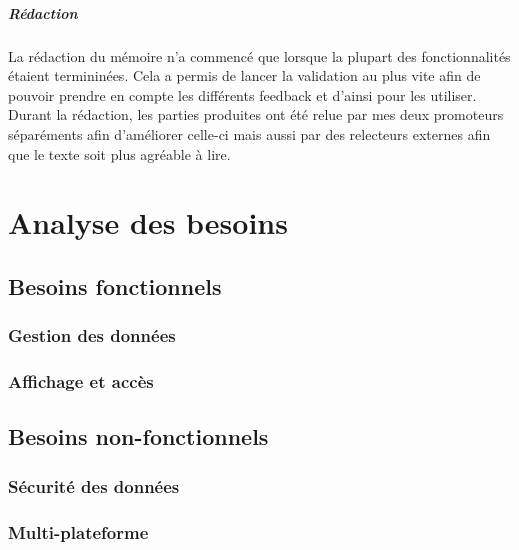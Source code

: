 \documentclass{EPL-master-thesis-covers-FR}
\begin{document}
			
			\paragraph*{Rédaction}
			La rédaction du mémoire n'a commencé que lorsque la plupart des fonctionnalités étaient termininées. Cela a permis de lancer la validation au plus vite afin de pouvoir prendre en compte les différents feedback et d'ainsi pour les utiliser.
			Durant la rédaction, les parties produites ont été relue par mes deux promoteurs séparéments afin d'améliorer celle-ci mais aussi par des relecteurs externes afin que le texte soit plus agréable à lire. 
			
			

	\chapter{Analyse des besoins}
		\label{sec:analyse_besoins}


		\section{Besoins fonctionnels}

			

			\subsection*{Gestion des données}
				\label{sec:gest_donnee}



			\subsection*{Affichage et accès}

			

		\section{Besoins non-fonctionnels}


			\subsection*{Sécurité des données}


			\subsection*{Multi-plateforme}
				
\end{document}
